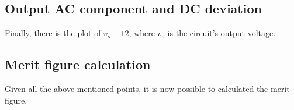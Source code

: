 \subsection{Output AC component and DC deviation}
Finally, there is the plot of $v_o -12$, where $v_o$ is the circuit's output voltage.


\subsection{Merit figure calculation}
Given all the above-mentioned points, it is now possible to calculated the merit figure.

